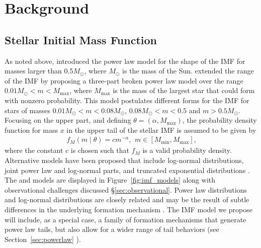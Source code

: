 \documentclass[ejs]{imsart}
\numberwithin{equation}{section}
\theoremstyle{plain}
\newcommand{\Msun}{M_{\odot}}
\newcommand{\Mmax}{M_{\text{max}}}
\newcommand{\Mmin}{M_{\text{min}}}
\begin{document}
\section{Background}
\label{sec:background}
\subsection{Stellar Initial Mass Function}

As noted above, \cite{salpeter55} introduced the power law model for the shape of the IMF for masses larger
than 0.5$\Msun$, where $\Msun$ is the mass of the Sun.
\cite{kroupa2001} extended the range of the IMF by proposing a three-part broken power law model 
over the range $0.01 \Msun < m < \Mmax$, where $\Mmax$ is the mass of the largest star that could form with nonzero probability.
This model postulates different forms for the IMF for stars of masses $0.01 \Msun < m < 0.08 \Msun$,
$0.08 \Msun < m < 0.5$ and $m > 0.5\Msun$.
Focusing on the upper part, and defining $\theta = (\alpha, \Mmax)$, the probability density function for mass $x$ in the upper tail of the stellar IMF is assumed to be given by
\begin{align}
	f_M(m \mid \theta) = cm^{-\alpha}\text{,}\;\; m \in [\Mmin, \Mmax]\text{,}
	\label{eq:imf}
\end{align}
where the constant $c$ is chosen such that $f_M$ is a valid probability density.  Alternative models have been proposed that include log-normal distributions, joint power law and log-normal parts, and truncated exponential distributions  \citep{Chabrier:2003oq, Chabrier:2003om, chabrier2005,IMF50,bastian2010, OffnerEtAl2014}.  The \cite{kroupa2001} and \cite{Chabrier:2003oq, Chabrier:2003om} models are displayed in Figure~\ref{fig:imf_models} along with observational challenges discussed \S\ref{sec:observational}.
Power law distributions and log-normal distributions are closely related and may be the result of subtle differences in the underlying formation mechanism \citep{Mitzenmacher2004}.  
The IMF model we propose will include, as a special case, a family of formation mechanisms that generate
power law tails, but also allow for a wider range of tail behaviors (see Section~\ref{sec:powerlaw} ).
\end{document}
